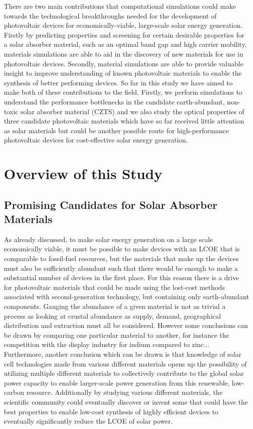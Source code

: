 There are two main contributions that computational simulations could make towards the technological breakthroughs needed for the development of photovoltaic devices for economically-viable, large-scale solar energy generation. Firstly by predicting properties and screening for certain desirable properties for a solar absorber material, such as an optimal band gap and high carrier mobility, materials simulations are able to aid in the discovery of new materials for use in photovoltaic devices. Secondly, material simulations are able to provide valuable insight to improve understanding of known photovoltaic materials to enable the synthesis of better performing devices. So far in this study we have aimed to make both of these contributions to the field. Firstly, we perform simulations to understand the performance bottlenecks in the candidate earth-abundant, non-toxic solar absorber material \CZTS (CZTS) and we also study the optical properties of three candidate photovoltaic materials which have so far received little attention as solar materials but could be another possible route for high-performance photovoltaic devices for cost-effective solar energy generation.



\section{Overview of this Study}

\subsection{Promising Candidates for Solar Absorber Materials}
As already discussed, to make solar energy generation on a large scale economically viable, it must be possible to make devices with an LCOE that is comparable to fossil-fuel resources, but the materials that make up the devices must also be sufficiently abundant such that there would be enough to make a substantial number of devices in the first place. For this reason there is a drive for photovoltaic materials that could be made using the lost-cost methods associated with second-generation technology, but containing only earth-abundant components. Gauging the abundance of a given material is not as trivial a process as looking at crustal abundance as supply, demand, geographical distribution and extraction must all be considered. However some conclusions can be drawn by comparing one particular material to another, for instance the competition with the display industry for indium compared to zinc... Furthermore, another conclusion which can be drawn is that knowledge of solar cell technologies made from various different materials opens up the possibility of utilizing multiple different materials to collectively contribute to the global solar power capacity to enable larger-scale power generation from this renewable, low-carbon resource. Additionally by studying various different materials, the scientific community could eventually discover or invent some that could have the best properties to enable low-cost synthesis of highly efficient devices to eventually significantly reduce the LCOE of solar power.\\

